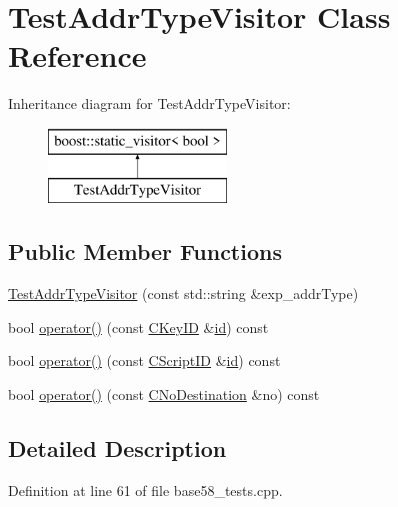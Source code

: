 \hypertarget{class_test_addr_type_visitor}{}\section{Test\+Addr\+Type\+Visitor Class Reference}
\label{class_test_addr_type_visitor}
Inheritance diagram for Test\+Addr\+Type\+Visitor\+:\begin{figure}[H]
\begin{center}
\leavevmode
\includegraphics[height=2.000000cm]{class_test_addr_type_visitor}
\end{center}
\end{figure}
\subsection*{Public Member Functions}
\begin{DoxyCompactItemize}
\item 
\hyperlink{class_test_addr_type_visitor_ae60ae920ab6c864c5543a9a795fde74a}{Test\+Addr\+Type\+Visitor} (const std\+::string \&exp\+\_\+addr\+Type)
\item 
bool \hyperlink{class_test_addr_type_visitor_a48efd26888a968e1b35843950a7c639f}{operator()} (const \hyperlink{class_c_key_i_d}{C\+Key\+I\+D} \&\hyperlink{db__test_8cc_a7441ef0865bcb3db9b8064dd7375c1ea}{id}) const 
\item 
bool \hyperlink{class_test_addr_type_visitor_a5168376a62c013762f6777076c456822}{operator()} (const \hyperlink{class_c_script_i_d}{C\+Script\+I\+D} \&\hyperlink{db__test_8cc_a7441ef0865bcb3db9b8064dd7375c1ea}{id}) const 
\item 
bool \hyperlink{class_test_addr_type_visitor_ad612b65af5ab7f6aead511daf97196a6}{operator()} (const \hyperlink{class_c_no_destination}{C\+No\+Destination} \&no) const 
\end{DoxyCompactItemize}


\subsection{Detailed Description}


Definition at line 61 of file base58\+\_\+tests.\+cpp.



